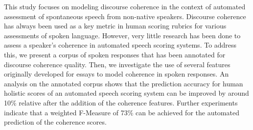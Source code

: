 This study focuses on modeling discourse coherence in the context of automated assessment of spontaneous speech from non-native speakers. Discourse coherence
 has always been used as a key metric in human scoring rubrics for various
 assessments of spoken language. However, very little research has been done to
 assess a speaker's coherence in automated speech scoring systems. To address
 this, we present a corpus of spoken responses that has been annotated for
 discourse coherence quality. Then, we investigate the use of several features
 originally developed for essays to model coherence in spoken responses. An
 analysis on the annotated corpus shows that the prediction accuracy for human
 holistic scores of an automated speech scoring system can be improved by around
 10\% relative after the addition of the coherence features.  Further experiments
 indicate that a weighted F-Measure of 73\% can be achieved for the automated
 prediction of the coherence scores.

